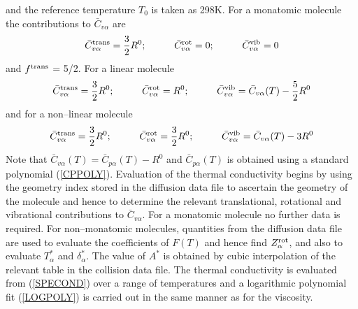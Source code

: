 \documentclass[dvips]{article}
\begin{document}
and the reference temperature $T_{0}$ is taken as 298K.  For a
monatomic molecule the contributions to $\bar{C}_{v\alpha}$ are
\begin{equation}
\bar{C}_{v\alpha}^{\rm trans} = \frac{3}{2}R^{0};\hspace{10mm}
\bar{C}_{v\alpha}^{\rm rot} = 0;\hspace{10mm}
\bar{C}_{v\alpha}^{\rm vib} = 0
\end{equation}
and $f^{\rm trans}$ = 5/2.  For a linear molecule
\begin{equation}
\bar{C}_{v\alpha}^{\rm trans} = \frac{3}{2}R^{0};\hspace{10mm}
\bar{C}_{v\alpha}^{\rm rot} = R^{0};\hspace{10mm}
\bar{C}_{v\alpha}^{\rm vib} = \bar{C}_{v\alpha}(T) - \frac{5}{2}R^{0}
\end{equation}
and for a non--linear molecule
\begin{equation}
\bar{C}_{v\alpha}^{\rm trans} = \frac{3}{2}R^{0};\hspace{10mm}
\bar{C}_{v\alpha}^{\rm rot} = \frac{3}{2}R^{0};\hspace{10mm}
\bar{C}_{v\alpha}^{\rm vib} = \bar{C}_{v\alpha}(T) -3R^{0}
\end{equation}
Note that $\bar{C}_{v\alpha}(T) = \bar{C}_{p\alpha}(T) - R^{0}$ and
$\bar{C}_{p\alpha}(T)$ is obtained using a standard polynomial (\ref{CPPOLY}). 
Evaluation of the thermal conductivity begins by using the geometry index
stored in the diffusion data file to ascertain the geometry of the
molecule and hence to determine the relevant translational, rotational and
vibrational contributions to $\bar{C}_{v\alpha}$.  For a monatomic
molecule no further data is required.  For non--monatomic molecules,
quantities from the diffusion data file are used to
evaluate the coefficients of $F(T)$ and hence find $Z_{\alpha}^{\rm rot}$, and
also to evaluate $T_{\alpha}^{*}$ and $\delta_{\alpha}^{*}$.  The value of
$A^{*}$ is obtained by cubic interpolation of the relevant table in the
collision data file.  The thermal conductivity is evaluated from
(\ref{SPECOND}) over a range of temperatures and a logarithmic
polynomial fit (\ref{LOGPOLY}) is carried out in the same manner as for the
viscosity.\\
\end{document}

